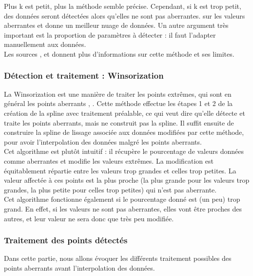 \documentclass[a4paper,12pt]{article} %
\begin{document}
                        Plus k est petit, plus la méthode semble précise. Cependant, si k est trop petit, des données seront détectées alors qu'elles ne sont pas aberrantes. sur les valeurs aberrantes et donne un meilleur nuage de données. Un autre argument très important est la proportion de paramètres à détecter : il faut l'adapter manuellement aux données.\\
                        
                        Les sources \cite{KNN1}, \cite{KNN2} et \cite{KNN3} donnent plus d'informations sur cette méthode et ses limites.

                
			\subsubsection{\label{winso}Détection et traitement : Winsorization}
				    La Winsorization est une manière de traiter les points extrêmes, qui sont en général les points aberrants \cite{Win1}, \cite{Win2}. Cette méthode effectue les étapes 1 et 2 de la création de la spline avec traitement préalable, ce qui veut dire qu'elle détecte et traite les points aberrants, mais ne construit pas la spline. Il suffit ensuite de construire la spline de lissage associée aux données modifiées par cette méthode, pour avoir l'interpolation des données malgré les points aberrants.\\
				    
				    Cet algorithme est plutôt intuitif : il récupère le pourcentage de valeurs données comme aberrantes et modifie les valeurs extrêmes. La modification est équitablement répartie entre les valeurs trop grandes et celles trop petites. La valeur affectée à ces points est la plus proche (la plus grande pour les valeurs trop grandes, la plus petite pour celles trop petites) qui n'est pas aberrante.\\
				    
                    Cet algorithme fonctionne également si le pourcentage donné est (un peu) trop grand. En effet, si les valeurs ne sont pas aberrantes, elles vont être proches des autres, et leur valeur ne sera donc que très peu modifiée.
			
			\subsubsection{Traitement des points détectés}
				
    				Dans cette partie, nous allons évoquer les différents traitement possibles des points aberrants avant l'interpolation des données.\\
                        
\end{document}
